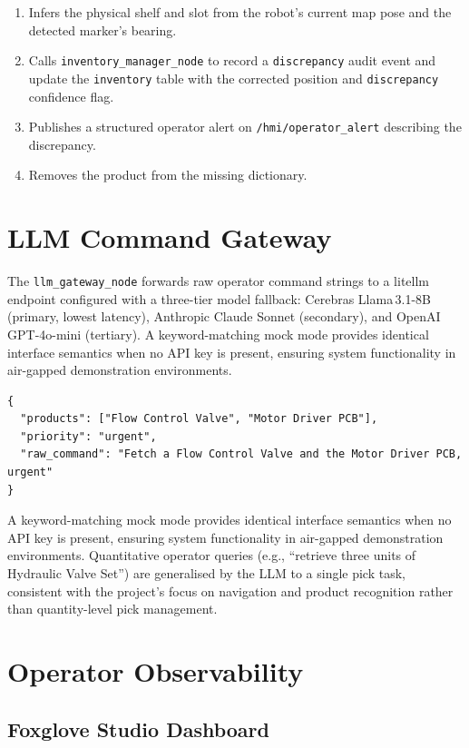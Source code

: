 \documentclass[12pt,a4paper]{report}
\begin{document}
\begin{enumerate}
    \item Infers the physical shelf and slot from the robot's current map pose and the detected marker's bearing.
    \item Calls \texttt{inventory\_manager\_node} to record a \texttt{discrepancy} audit event and update the \texttt{inventory} table with the corrected position and \texttt{discrepancy} confidence flag.
    \item Publishes a structured operator alert on \texttt{/hmi/operator\_alert} describing the discrepancy.
    \item Removes the product from the missing dictionary.
\end{enumerate}

\section{LLM Command Gateway}

The \texttt{llm\_gateway\_node} forwards raw operator command strings to a litellm endpoint configured with a three-tier model fallback: Cerebras Llama\,3.1-8B (primary, lowest latency), Anthropic Claude Sonnet (secondary), and OpenAI GPT-4o-mini (tertiary). A keyword-matching mock mode provides identical interface semantics when no API key is present, ensuring system functionality in air-gapped demonstration environments.

\begin{lstlisting}[caption={LLM-parsed task request JSON schema.}]
{
  "products": ["Flow Control Valve", "Motor Driver PCB"],
  "priority": "urgent",
  "raw_command": "Fetch a Flow Control Valve and the Motor Driver PCB, urgent"
}
\end{lstlisting}

A keyword-matching mock mode provides identical interface semantics when no API key is present, ensuring system functionality in air-gapped demonstration environments. Quantitative operator queries (e.g., ``retrieve three units of Hydraulic Valve Set'') are generalised by the LLM to a single pick task, consistent with the project's focus on navigation and product recognition rather than quantity-level pick management.

\section{Operator Observability}

\subsection{Foxglove Studio Dashboard}
\end{document}
